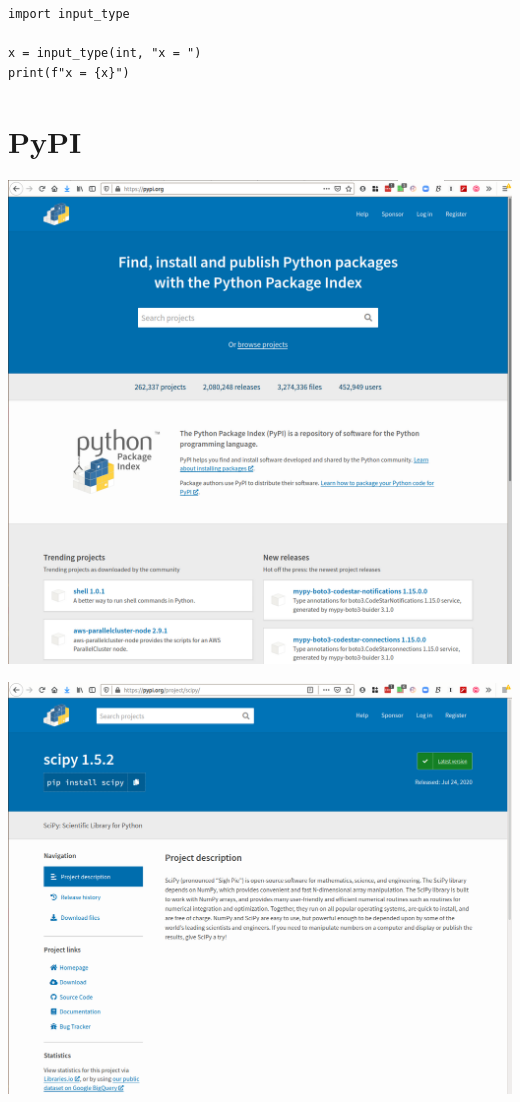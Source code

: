 \begin{frame}[fragile]
  \begin{example}
    \begin{lstlisting}
import input_type

x = input_type(int, "x = ")
print(f"x = {x}")
    \end{lstlisting}
  \end{example}
\end{frame}


\section{PyPI}

\begin{frame}
  \includegraphics[width=\columnwidth]{figs/pypi.png}
\end{frame}

\begin{frame}
  \includegraphics[width=\columnwidth]{figs/pypi-scipy.png}
\end{frame}

